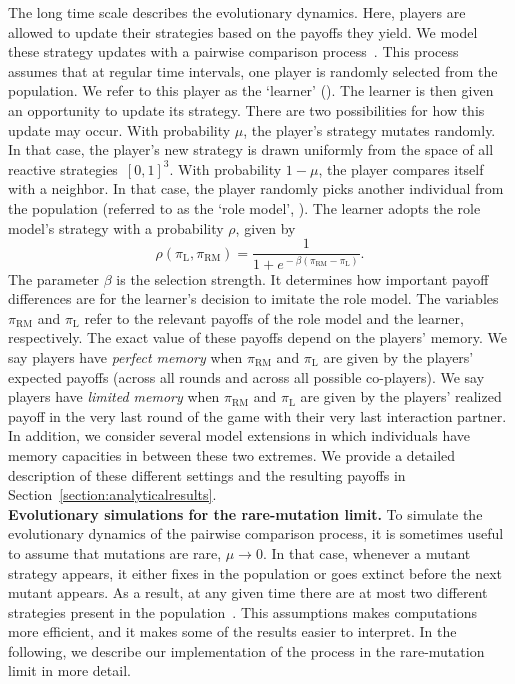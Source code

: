 \documentclass[11pt]{article}
\def\rolemodel{\text{RM}}
\def\learner{\text{L}}
\theoremstyle{plainCl1}
\theoremstyle{plainCl2}
\begin{document}
The long time scale describes the evolutionary dynamics. 
Here, players are allowed to update their strategies based on the payoffs they yield. 
We model these strategy updates with a pairwise comparison process~\citep{traulsen2007pairwise}.
This process assumes that at regular time intervals, one player is randomly selected from the population.
We refer to this player as the `learner' (\learner). 
The learner is then given an opportunity to update its strategy. 
There are two possibilities for how this update may occur. 
With probability $\mu$, the player's strategy mutates randomly. 
In that case, the player's new strategy is drawn uniformly from the space of all reactive strategies~$[0,1]^3$.  
With probability $1\!-\!\mu$, the player compares itself with a neighbor. 
In that case, the player randomly picks another individual from the population (referred to as the `role model', \rolemodel). 
The learner adopts the role model's strategy with a probability \(\rho\), given by
\begin{equation} \label{Eq:rho}
    \rho(\pi_{\learner}, \pi_{\rolemodel}) = \frac{1}{1\!+\! e^{\!-\!\beta (\pi_\rolemodel - \pi_\learner)}}.
\end{equation}
The parameter \(\beta\) is the selection strength.
It determines how important payoff differences are for the learner's decision to imitate the role model. 
The variables $\pi_\rolemodel$ and $\pi_\learner$ refer to the relevant payoffs of the role model and the learner, respectively. 
The exact value of these payoffs depend on the players' memory. 
We say players have {\it perfect memory} when $\pi_\rolemodel$ and $\pi_\learner$ are given by the players' expected payoffs (across all rounds and across all possible co-players). 
We say players have {\it limited memory} when $\pi_\rolemodel$ and $\pi_\learner$ are given by the players' realized payoff in the very last round of the game with their very last interaction partner. 
In addition, we consider several model extensions in which individuals have memory capacities in between these two extremes. 
We provide a detailed description of these different settings and the resulting payoffs in Section~\ref{section:analyticalresults}.\\


\noindent
{\bf Evolutionary simulations for the rare-mutation limit.} 
To simulate the evolutionary dynamics of the pairwise comparison process, it is sometimes useful to assume that mutations are rare, $\mu\!\rightarrow\!0$. 
In that case, whenever a mutant strategy appears, it either fixes in the population or goes extinct before the next mutant appears. 
As a result, at any given time there are at most two different strategies present in the population~\citep{fudenberg:JET:2006,wu:JMB:2012,mcavoy:jet:2015}. 
This assumptions makes computations more efficient, and it makes some of the results easier to interpret.
In the following, we describe our implementation of the process in the rare-mutation limit in more detail. 
\end{document}
